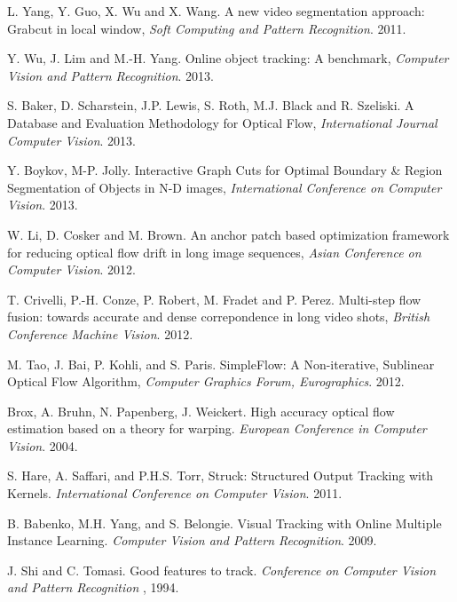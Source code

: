 \begin{thebibliography}{99}
L. Yang, Y. Guo, X. Wu and X. Wang. A new video segmentation approach: Grabcut in local window,  {\it Soft Computing and Pattern Recognition}. 2011.

Y. Wu, J. Lim and M.-H. Yang. Online object tracking: A benchmark, {\it Computer Vision and Pattern Recognition}. 2013.

S. Baker, D. Scharstein, J.P. Lewis, S. Roth, M.J. Black and R. Szeliski. A Database and Evaluation Methodology for Optical Flow, {\it International Journal Computer Vision}. 2013.

Y. Boykov, M-P. Jolly. Interactive Graph Cuts for Optimal Boundary \& Region Segmentation of Objects in N-D images, {\it International Conference on Computer Vision}. 2013.

W. Li, D. Cosker and M. Brown. An anchor patch based optimization framework for reducing optical flow drift in long image sequences, {\it Asian Conference on Computer Vision}. 2012.

T. Crivelli, P.-H. Conze, P. Robert, M. Fradet and P. Perez. Multi-step flow fusion: towards accurate and dense correpondence in long video shots, {\it British Conference Machine Vision}. 2012.

M. Tao, J. Bai, P. Kohli, and S. Paris. SimpleFlow: A Non-iterative, Sublinear Optical Flow Algorithm, {\it Computer Graphics Forum, Eurographics}. 2012.

Brox, A. Bruhn, N. Papenberg, J. Weickert. High accuracy optical flow estimation based on a theory for warping. {\it European Conference in Computer Vision}. 2004.

S. Hare, A. Saffari, and P.H.S. Torr, Struck: Structured Output Tracking with Kernels.  {\it International Conference on Computer Vision}. 2011.

B. Babenko, M.H. Yang, and S. Belongie. Visual Tracking with Online Multiple Instance Learning. {\it Computer Vision and Pattern Recognition}. 2009.

J. Shi and C. Tomasi. Good features to track. {\it Conference on Computer Vision and Pattern Recognition }, 1994. 


\end{thebibliography}